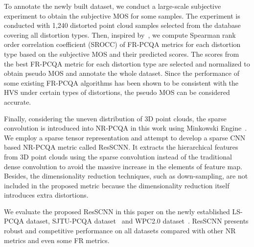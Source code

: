 \documentclass[acmsmall]{acmart}
\begin{document}
\par To annotate the newly built dataset, we conduct a large-scale subjective experiment to obtain the subjective MOS for some samples. The experiment is conducted with 1,240 distorted point cloud samples selected from the database covering all distortion types. Then, inspired by~\cite{Wu2020PesudoMOS}, we compute Spearman rank order correlation coefficient (SROCC) of FR-PCQA metrics for each distortion type based on the subjective MOS and their predicted scores. The scores from the best FR-PCQA metric for each distortion type are selected and normalized to obtain pseudo MOS and annotate the whole dataset. Since the performance of some existing FR-PCQA algorithms has been shown to be consistent with the HVS under certain types of distortions, the pseudo MOS can be considered accurate.

\par Finally, considering the uneven distribution of 3D point clouds, the sparse convolution is introduced into NR-PCQA in this work using Minkowski Engine~\cite{Choy2019Minkowski}. We employ a sparse tensor representation and attempt to develop a sparse CNN based NR-PCQA metric called ResSCNN. It extracts the hierarchical features from 3D point clouds using the sparse convolution instead of the traditional dense convolution to avoid the massive increase in the elements of feature map. Besides, the dimensionality reduction techniques, such as down-sampling, are not included in the proposed metric because the dimensionality reduction itself introduces extra distortions.

\par We evaluate the proposed ResSCNN in this paper on the newly established LS-PCQA dataset,  SJTU-PCQA dataset~\cite{Yang2020TMM3DTO2D} and WPC2.0 dataset~\cite{Su2019WPC,Liu2022WPC}. ResSCNN presents robust and competitive performance on all datasets compared with other NR metrics and even some FR metrics.
\end{document}
